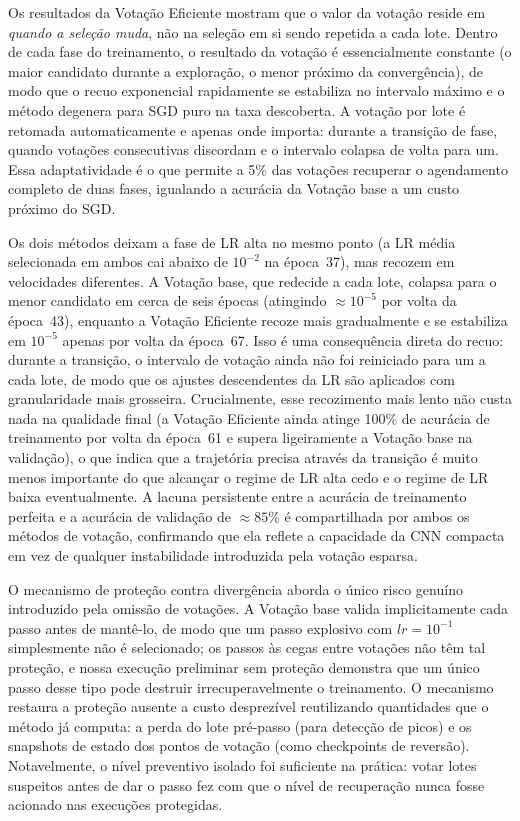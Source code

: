 \documentclass[conference]{IEEEtran}
\begin{document}
Os resultados da Votação Eficiente mostram que o valor da votação reside em \emph{quando a seleção muda}, não na seleção em si sendo repetida a cada lote. Dentro de cada fase do treinamento, o resultado da votação é essencialmente constante (o maior candidato durante a exploração, o menor próximo da convergência), de modo que o recuo exponencial rapidamente se estabiliza no intervalo máximo e o método degenera para SGD puro na taxa descoberta. A votação por lote é retomada automaticamente e apenas onde importa: durante a transição de fase, quando votações consecutivas discordam e o intervalo colapsa de volta para um. Essa adaptatividade é o que permite a 5\% das votações recuperar o agendamento completo de duas fases, igualando a acurácia da Votação base a um custo próximo do SGD.

Os dois métodos deixam a fase de LR alta no mesmo ponto (a LR média selecionada em ambos cai abaixo de $10^{-2}$ na época~37), mas recozem em velocidades diferentes. A Votação base, que redecide a cada lote, colapsa para o menor candidato em cerca de seis épocas (atingindo $\approx 10^{-5}$ por volta da época~43), enquanto a Votação Eficiente recoze mais gradualmente e se estabiliza em $10^{-5}$ apenas por volta da época~67. Isso é uma consequência direta do recuo: durante a transição, o intervalo de votação ainda não foi reiniciado para um a cada lote, de modo que os ajustes descendentes da LR são aplicados com granularidade mais grosseira. Crucialmente, esse recozimento mais lento não custa nada na qualidade final (a Votação Eficiente ainda atinge 100\% de acurácia de treinamento por volta da época~61 e supera ligeiramente a Votação base na validação), o que indica que a trajetória precisa através da transição é muito menos importante do que alcançar o regime de LR alta cedo e o regime de LR baixa eventualmente. A lacuna persistente entre a acurácia de treinamento perfeita e a acurácia de validação de $\approx 85\%$ é compartilhada por ambos os métodos de votação, confirmando que ela reflete a capacidade da CNN compacta em vez de qualquer instabilidade introduzida pela votação esparsa.

O mecanismo de proteção contra divergência aborda o único risco genuíno introduzido pela omissão de votações. A Votação base valida implicitamente cada passo antes de mantê-lo, de modo que um passo explosivo com $lr = 10^{-1}$ simplesmente não é selecionado; os passos às cegas entre votações não têm tal proteção, e nossa execução preliminar sem proteção demonstra que um único passo desse tipo pode destruir irrecuperavelmente o treinamento. O mecanismo restaura a proteção ausente a custo desprezível reutilizando quantidades que o método já computa: a perda do lote pré-passo (para detecção de picos) e os snapshots de estado dos pontos de votação (como checkpoints de reversão). Notavelmente, o nível preventivo isolado foi suficiente na prática: votar lotes suspeitos antes de dar o passo fez com que o nível de recuperação nunca fosse acionado nas execuções protegidas.
\end{document}
